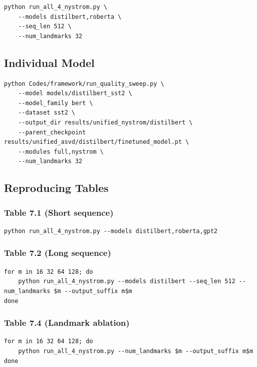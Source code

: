 \begin{lstlisting}
python run_all_4_nystrom.py \
    --models distilbert,roberta \
    --seq_len 512 \
    --num_landmarks 32
\end{lstlisting}

\subsection{Individual Model}

\begin{lstlisting}
python Codes/framework/run_quality_sweep.py \
    --model models/distilbert_sst2 \
    --model_family bert \
    --dataset sst2 \
    --output_dir results/unified_nystrom/distilbert \
    --parent_checkpoint results/unified_asvd/distilbert/finetuned_model.pt \
    --modules full,nystrom \
    --num_landmarks 32
\end{lstlisting}

\subsection{Reproducing Tables}

\subsubsection{Table 7.1 (Short sequence)}

\begin{lstlisting}
python run_all_4_nystrom.py --models distilbert,roberta,gpt2
\end{lstlisting}

\subsubsection{Table 7.2 (Long sequence)}

\begin{lstlisting}
for m in 16 32 64 128; do
    python run_all_4_nystrom.py --models distilbert --seq_len 512 --num_landmarks $m --output_suffix m$m
done
\end{lstlisting}

\subsubsection{Table 7.4 (Landmark ablation)}

\begin{lstlisting}
for m in 16 32 64 128; do
    python run_all_4_nystrom.py --num_landmarks $m --output_suffix m$m
done
\end{lstlisting}

